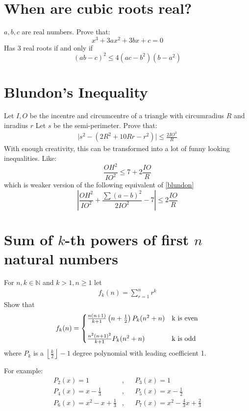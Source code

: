 \documentclass{article}
\begin{document}
\section{When are cubic roots real?}
$a,b,c$ are real numbers. Prove that:
$$x^3+3ax^2+3bx+c=0$$
Has 3 real roots if and only if
$$(ab-c)^2 \leq 4(ac-b^2)(b-a^2)$$

\section{Blundon's Inequality}
Let $I,O$ be the incentre and circumcentre of a triangle with circumradius $R$ and inradius $r$
Let $s$ be the semi-perimeter.
Prove that:
\begin{align} \bigg | s^2-(2R^2 + 10 Rr - r^2) \bigg | \leq \frac {2 IO^3}{R} \label{blundon}\end{align}
With enough creativity, this can be transformed into a lot of funny looking inequalities. Like:
$$\frac {OH^2}{IO^2} \leq 7 + 2 \frac {IO}{R}$$
which is weaker version of the following equivalent of \eqref{blundon}
$$ \left| \frac {OH^2}{IO^2} + \frac {\sum (a-b)^2}{2 IO^2} - 7 \right| \leq 2 \frac {IO}{R}$$

\section{Sum of $k$-th powers of first $n$ natural numbers}

For $n,k \in \mathbb{N}$ and $k>1, n\geq 1$ let
\begin{align*}
    f_k(n) = \sum_{r=1}^{n} r^k
\end{align*}
Show that
\begin{align*}
    f_k(n) = \begin{cases}
    \frac{n(n+1)}{k+1}\left(n+\frac{1}{2}\right)P_k(n^2 + n) & $k$ \textrm{ is even} \\\\
    \frac{n^2(n+1)^2}{k+1}P_k(n^2 + n) & $k$ \textrm{ is odd} 
    \end{cases}
\end{align*}
where $P_k$ is a $\left\lfloor \frac{k}{2}\right\rfloor-1$ degree polynomial with leading coefficient 1.

For example:
\begin{align*}
    P_2(x) = 1 &,&& P_3(x) = 1 \\
    P_4(x) = x-\frac{1}{3} &,&& P_5(x) = x-\frac{1}{2} \\
    P_6(x) = x^2-x+\frac{1}{3} &,&& P_7(x) = x^2-\frac{4}{3}x+\frac{2}{3}
\end{align*}
\end{document}
